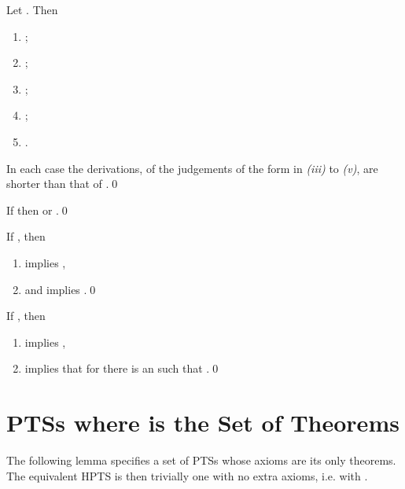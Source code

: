 \documentclass{LMCS}
\begin{document}
\begin{lem}\label{L:four}

  Let .  Then
\begin{enumerate}[\em(i)]
\item
;

\item
;

\item
\hfill\break
;

\item
\hfill\break
;

\item
.
\end{enumerate}
  In each case the derivations, of the judgements of the form
   in \emph{(iii)} to \emph{(v)}, are shorter than
  that of .\qed
\end{lem}

\begin{lem}\label{L:five}

  If  then   or .\qed
\end{lem}

\begin{lem}\label{L:six}

  If , then
\begin{enumerate}[\em(i)]
\item  implies
  ,
\item and  implies .\qed
\end{enumerate}
\end{lem}

\begin{lem}\label{L:seven}

  If , then
\begin{enumerate}[\em(i)]
\item  implies ,
\item implies that for  there is an  such that .\qed
\end{enumerate}
\end{lem}

\section{PTSs where \texorpdfstring{}{A} is the Set of 
  Theorems}\label{S:PTSST}

 \noindent The following lemma specifies a set of PTSs whose axioms
 are its only theorems.  The equivalent HPTS is then trivially one
 with no extra axioms, i.e. with .
\end{document}
